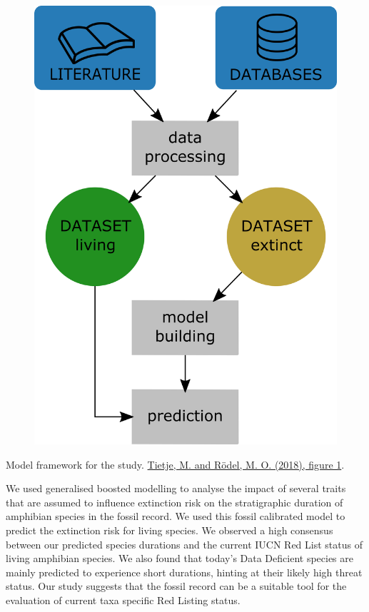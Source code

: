 \documentclass[]{article}
\begin{document}
\begin{figure}
\centering
\includegraphics{model_framework.jpg}
\caption{}
\end{figure}

 Model framework for the study.
\href{https://doi.org/10.1111/ele.13080}{Tietje, M. and Rödel, M. O.
(2018), figure 1}.

We used generalised boosted modelling to analyse the impact of several
traits that are assumed to influence extinction risk on the
stratigraphic duration of amphibian species in the fossil record. We
used this fossil calibrated model to predict the extinction risk for
living species. We observed a high consensus between our predicted
species durations and the current IUCN Red List status of living
amphibian species. We also found that today's Data Deficient species are
mainly predicted to experience short durations, hinting at their likely
high threat status. Our study suggests that the fossil record can be a
suitable tool for the evaluation of current taxa specific Red Listing
status.
\end{document}
